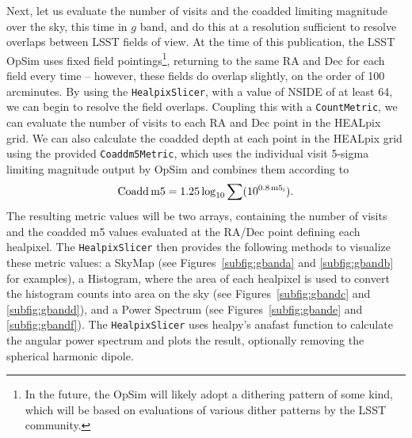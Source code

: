 \documentclass[]{spie}  %
\begin{document}
Next, let us evaluate the number of visits and
the coadded limiting magnitude over the sky, this time in $g$ band,
and do this at a resolution sufficient to resolve overlaps between
LSST fields of view. At the time of this publication, the LSST OpSim uses fixed field
pointings\footnote{In the future, the OpSim will likely adopt a
dithering pattern of some kind, which will be based on evaluations of
various dither patterns by the LSST community.}, returning to the
same RA and Dec for each field every time -- however, these fields do
overlap slightly, on the order of 100 arcminutes. By using the
{\tt HealpixSlicer}, with a value of NSIDE of at least 64, we can begin to
resolve the field overlaps.  Coupling this with a {\tt CountMetric}, we can evaluate
the number of visits to each RA and Dec point in the HEALpix grid. We
can also calculate the coadded depth at each point in the HEALpix grid
using the provided {\tt Coaddm5Metric}, which uses the individual visit
5-sigma limiting magnitude output by OpSim and combines them according
to
\begin{equation}
\rm{Coadd\, m5} = 1.25 \log_{10} \sum ( 10^{0.8 \,\rm{m5_i}} ).
\end{equation}
The resulting metric values will be two arrays, containing the number of visits and the
coadded m5 values evaluated at the RA/Dec point defining each
healpixel. The {\tt HealpixSlicer} then provides the following methods to
visualize these metric values: a SkyMap (see
Figures~\ref{subfig:gbanda} and \ref{subfig:gbandb} for examples), a Histogram, where the area of each healpixel
is used to convert the histogram counts into area on the sky (see
Figures~\ref{subfig:gbandc} and \ref{subfig:gbandd}), and a Power Spectrum (see
Figures~\ref{subfig:gbande} and \ref{subfig:gbandf}). The {\tt HealpixSlicer} uses
healpy's anafast function to calculate the angular power spectrum and
plots the result, optionally removing the spherical harmonic dipole. 
\end{document}
